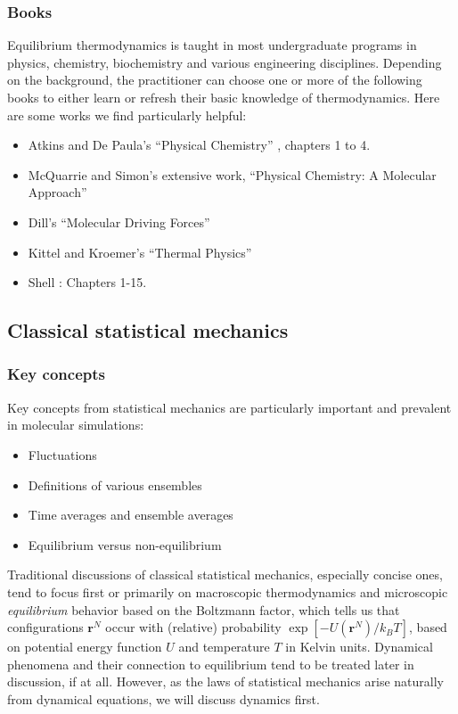 \documentclass[9pt,bestpractices]{livecoms}
\newcommand{\conf}{\mathbf{r}^N}
\begin{document}
\subsubsection{Books}
Equilibrium thermodynamics is taught in most undergraduate programs in physics, chemistry, biochemistry and various engineering disciplines.
Depending on the background, the practitioner can choose one or more of the following books to either learn or refresh their basic knowledge of thermodynamics. 
Here are some works we find particularly helpful:
\begin{itemize}
\item Atkins and De Paula's ``Physical Chemistry'' \cite{AtkinsBook}, chapters 1 to 4.
\item McQuarrie and Simon's extensive work, ``Physical Chemistry: A Molecular Approach''~\cite{McQuarrie:1997:}
\item Dill's ``Molecular Driving Forces''~\cite{DillBook}
\item Kittel and Kroemer's ``Thermal Physics''~\cite{Kittel:1980:}
\item Shell \cite{ShellBook}: Chapters 1-15.
\end{itemize}


\subsection{Classical statistical mechanics}
\label{sec:stat_mech}
\subsubsection{Key concepts}
Key concepts from statistical mechanics are particularly important and prevalent in molecular simulations:
\begin{itemize}
\item Fluctuations
\item Definitions of various ensembles
\item Time averages and ensemble averages
\item Equilibrium versus non-equilibrium
\end{itemize}

Traditional discussions of classical statistical mechanics, especially concise ones, tend to focus first or primarily on macroscopic thermodynamics and microscopic \emph{equilibrium} behavior based on the Boltzmann factor, which tells us that configurations $\conf$ occur with (relative) probability $\exp[-U(\conf)/k_B T]$, based on potential energy function $U$ and temperature $T$ in Kelvin units.  
Dynamical phenomena and their connection to equilibrium tend to be treated later in discussion, if at all.
However, as the laws of statistical mechanics arise naturally from dynamical equations, we will discuss dynamics first.
\end{document}
